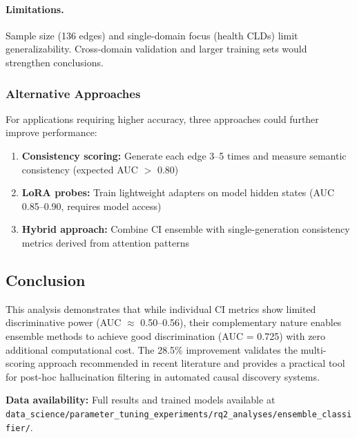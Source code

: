 \paragraph{Limitations.} Sample size (136 edges) and single-domain focus (health CLDs) limit generalizability. Cross-domain validation and larger training sets would strengthen conclusions.

\subsubsection{Alternative Approaches}

For applications requiring higher accuracy, three approaches could further improve performance:

\begin{enumerate}
    \item \textbf{Consistency scoring:} Generate each edge 3--5 times and measure semantic consistency (expected AUC $>$ 0.80)
    \item \textbf{LoRA probes:} Train lightweight adapters on model hidden states (AUC 0.85--0.90, requires model access)
    \item \textbf{Hybrid approach:} Combine CI ensemble with single-generation consistency metrics derived from attention patterns
\end{enumerate}

\subsection{Conclusion}

This analysis demonstrates that while individual CI metrics show limited discriminative power (AUC $\approx$ 0.50--0.56), their complementary nature enables ensemble methods to achieve good discrimination (AUC = 0.725) with zero additional computational cost. The 28.5\% improvement validates the multi-scoring approach recommended in recent literature and provides a practical tool for post-hoc hallucination filtering in automated causal discovery systems.

\textbf{Data availability:} Full results and trained models available at \texttt{data\_science/parameter\_tuning\_experiments/rq2\_analyses/ensemble\_classifier/}.
